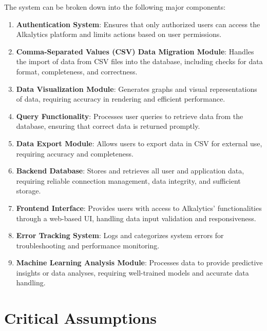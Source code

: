 \documentclass{article}
\begin{document}
The system can be broken down into the following major components:
\begin{enumerate}
  \item \textbf{Authentication System}: Ensures that only authorized users can access the Alkalytics platform and limits actions 
  based on user permissions.
  \item \textbf{Comma-Separated Values (CSV) Data Migration Module}: Handles the import of data from CSV files into the database,
  including checks for data format, completeness, and correctness.
  \item \textbf{Data Visualization Module}: Generates graphs and visual representations of data, requiring accuracy in rendering and 
  efficient performance.
  \item \textbf{Query Functionality}: Processes user queries to retrieve data from the database, ensuring that correct data is returned promptly.
  \item \textbf{Data Export Module}: Allows users to export data in CSV for external use, requiring accuracy and completeness.
  \item \textbf{Backend Database}: Stores and retrieves all user and application data, requiring reliable connection management, data integrity, and sufficient storage.
  \item \textbf{Frontend Interface}: Provides users with access to Alkalytics' functionalities through a web-based UI, handling data input validation and responsiveness.
  \item \textbf{Error Tracking System}: Logs and categorizes system errors for troubleshooting and performance monitoring.
  \item \textbf{Machine Learning Analysis Module}: Processes data to provide predictive insights or data analyses, requiring well-trained models and accurate data handling.
\end{enumerate}

\section{Critical Assumptions}
\end{document}

